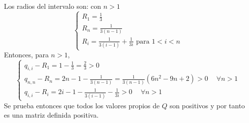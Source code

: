     Los radios del intervalo son:
    con $n > 1$
    \begin{equation}
        \begin{cases}
            R_1 = \frac{1}{3} \\
            R_n = \frac{1}{3(n-1)} \\
            R_i = \frac{1}{3(i-1)} + \frac{1}{3i} \text{ para }  1<i<n
        \end{cases}
    \end{equation}
    Entonces, para $n > 1$,
    \begin{equation}
        \begin{cases}
            q_{i,i} - R_1 = 1 - \frac{1}{3} = \frac{2}{3} > 0 \\
            q_{n,n} - R_n =  2n-1 - \frac{1}{3(n-1)} = \frac{1}{3(n-1)}(6n^2 - 9n + 2) > 0 \phantom{-}\forall n>1 \\
            q_{i,i} - R_i = 2i-1 - \frac{1}{3(i-1)} - \frac{1}{3i} > 0 \phantom{-}\forall n>1
        \end{cases}
    \end{equation}
    Se prueba entonces que todos los valores propios de $Q$ son positivos y por tanto es una matriz definida positiva.